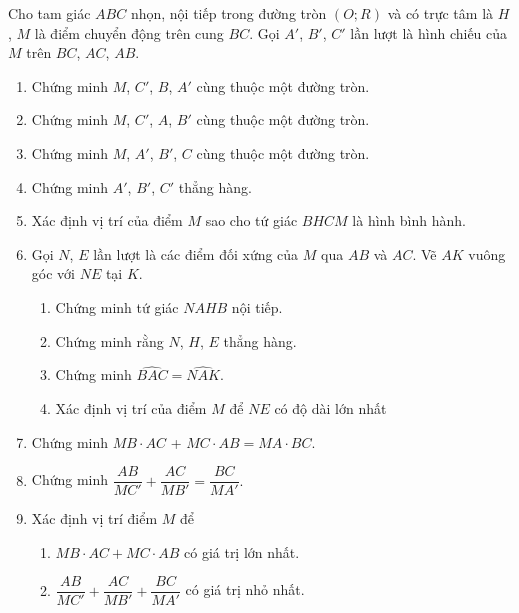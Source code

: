 \begin{bt}%
	Cho tam giác $ABC$ nhọn, nội tiếp trong đường tròn $(O;R)$
	và có trực tâm là $H$, $M$ là điểm chuyển động trên cung $BC$. Gọi $A'$, $B'$, $C'$ lần lượt là hình chiếu của $M$ trên $BC$, $AC$, $AB$.
	\begin{enumerate}
		\item Chứng minh $M$, $C'$, $B$, $A'$ cùng thuộc một đường tròn.
		\item Chứng minh $M$, $C'$, $A$, $B'$ cùng thuộc một đường tròn.
		\item Chứng minh $M$, $A'$, $B'$, $C$ cùng thuộc một đường tròn.
		\item Chứng minh $A'$, $B'$, $C'$ thẳng hàng.
		\item Xác định vị trí của điểm $M$ sao cho tứ giác $BHCM$ là hình bình hành.
		\item Gọi $N$, $E$ lần lượt là các điểm đối xứng của $M$ qua $AB$ và $AC$. Vẽ $AK$ vuông góc với $NE$ tại $K$.
		\begin{enumerate}[1)]
			\item Chứng minh tứ giác $NAHB$ nội tiếp.
			\item Chứng minh rằng $N$, $H$, $E$ thẳng hàng.
			\item Chứng minh $\widehat{BAC} =\widehat{NAK}$.
			\item Xác định vị trí của điểm $M$ để $NE$ có độ dài lớn nhất 
		\end{enumerate}
		\item Chứng minh $MB \cdot AC$ + $MC \cdot AB =MA\cdot BC$.
		\item Chứng minh $\dfrac{AB}{MC'} + \dfrac{AC}{MB'} = \dfrac{BC}{MA'}.$
		\item Xác định vị trí điểm $M$ để 
		\begin{enumerate}[1)]
			\item $MB \cdot AC + MC \cdot AB$ có giá trị lớn nhất.
			\item $\dfrac{AB}{MC'} + \dfrac{AC}{MB'} + \dfrac{BC}{MA'} $ có giá trị nhỏ nhất.
		\end{enumerate}
		
	\end{enumerate}
	
\end{bt}
